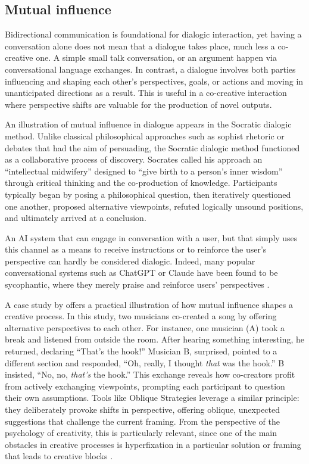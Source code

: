 \subsection{Mutual influence}

Bidirectional communication is foundational for dialogic interaction, yet having a conversation alone does not mean that a dialogue takes place, much less a co-creative one. A simple small talk conversation, or an argument happen via conversational language exchanges. In contrast, a dialogue involves both parties influencing and shaping each other's perspectives, goals, or actions \citep{Bown2020-zn} and moving in unanticipated directions as a result. This is useful in a co-creative interaction where perspective shifts are valuable for the production of novel outputs. 

An illustration of mutual influence in dialogue appears in the Socratic dialogic method. Unlike classical philosophical approaches such as sophist rhetoric or debates that had the aim of persuading, the Socratic dialogic method functioned as a collaborative process of discovery. Socrates called his approach an ``intellectual midwifery'' designed to ``give birth to a person's inner wisdom'' through critical thinking and the co-production of knowledge\citep{Nails2005-iq, Wikipedia-contributors2024-hr}. Participants typically began by posing a philosophical question, then iteratively questioned one another, proposed alternative viewpoints, refuted logically unsound positions, and ultimately arrived at a conclusion. 

An AI system that can engage in conversation with a user, but that simply uses this channel as a means to receive instructions or to reinforce the user's perspective can hardly be considered dialogic. Indeed, many popular conversational systems such as ChatGPT or Claude have been found to be sycophantic, where they merely praise and reinforce users' perspectives \citep{Sharma2023-or}.

A case study by \citet{Bown2020-oc} offers a practical illustration of how mutual influence shapes a creative process. In this study, two musicians co-created a song by offering alternative perspectives to each other. For instance, one musician (A) took a break and listened from outside the room. After hearing something interesting, he returned, declaring ``That's the hook!'' Musician B, surprised, pointed to a different section and responded, ``Oh, really, I thought \textit{that} was the hook.'' B insisted, ``No, no, \textit{that's} the hook.'' This exchange reveals how co-creators profit from actively exchanging viewpoints, prompting each participant to question their own assumptions. Tools like Oblique Strategies \citep{Eno1975-jv} leverage a similar principle: they deliberately provoke shifts in perspective, offering oblique, unexpected suggestions that challenge the current framing. From the perspective of the psychology of creativity, this is particularly relevant, since one of the main obstacles in creative processes is hyperfixation in a particular solution or framing that leads to creative blocks \citep{Jansson1991-wy}. 

